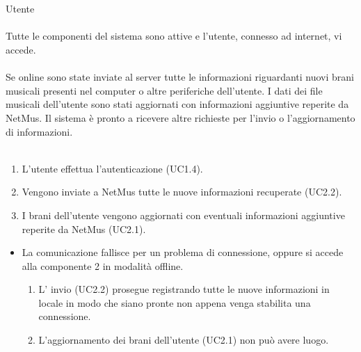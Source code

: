 \vspace*{0.5cm}
\\\\
 Utente \\\\
 Tutte le componenti del sistema sono attive e l'utente,
connesso ad internet, vi accede. \\\\ 
 Se online sono state inviate al server tutte le
informazioni riguardanti nuovi brani musicali presenti nel computer o altre periferiche
dell'utente. I dati dei file musicali dell'utente sono stati aggiornati con
informazioni aggiuntive reperite da NetMus. Il sistema \`e pronto a ricevere altre
richieste per l'invio o l'aggiornamento di informazioni. \\\\
\begin{enumerate}
  \item L'utente effettua l'autenticazione (UC1.4).
  \item Vengono inviate a NetMus tutte le nuove informazioni recuperate (UC2.2).
  \item I brani dell'utente vengono aggiornati con eventuali informazioni
  aggiuntive reperite da NetMus (UC2.1).
\end{enumerate}
\begin{itemize}
  \item La comunicazione fallisce per un problema di connessione, oppure si
  accede alla componente 2 in modalit\`a offline.
  \begin {enumerate}
    \item L' invio (UC2.2) prosegue registrando tutte le nuove informazioni
    in locale in modo che siano pronte non appena venga stabilita una
    connessione.
    \item L'aggiornamento dei brani dell'utente (UC2.1) non pu\`o avere luogo.
  \end{enumerate}
\end{itemize}
\newpage

